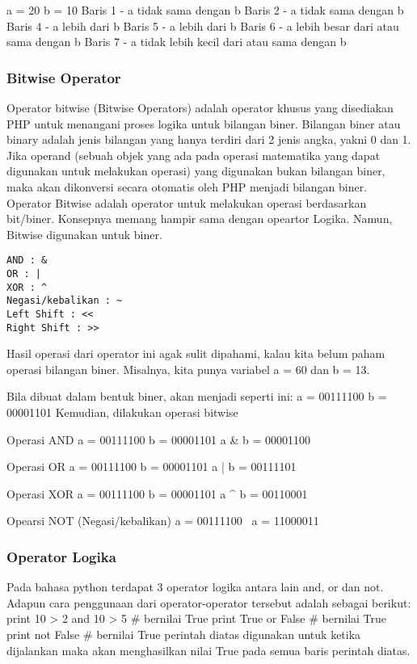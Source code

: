 \begin{eqation}
a =  20
b =  10
Baris 1 - a tidak sama dengan b
Baris 2 - a tidak sama dengan b
Baris 4 - a lebih dari b
Baris 5 - a lebih dari b
Baris 6 - a lebih besar dari atau sama dengan b
Baris 7 - a tidak lebih kecil dari atau sama dengan b

\subsubsection{Bitwise Operator}
Operator bitwise (Bitwise Operators) adalah operator khusus yang disediakan PHP untuk menangani proses logika untuk bilangan biner. Bilangan biner atau binary adalah jenis bilangan yang hanya terdiri dari 2 jenis angka, yakni 0 dan 1. Jika operand (sebuah objek yang ada pada operasi matematika yang dapat digunakan untuk melakukan operasi) yang digunakan bukan bilangan biner, maka akan dikonversi secara otomatis oleh PHP menjadi bilangan biner. Operator Bitwise adalah operator untuk melakukan operasi berdasarkan bit/biner. Konsepnya memang hampir sama dengan opeartor Logika. Namun, Bitwise digunakan untuk biner.
\begin{verbatim}
AND : &
OR : |
XOR : ^
Negasi/kebalikan : ~
Left Shift : <<
Right Shift : >>
\end{verbatim}

Hasil operasi dari operator ini agak sulit dipahami, kalau kita belum paham operasi bilangan biner.
Misalnya, kita punya variabel a = 60 dan b = 13.

Bila dibuat dalam bentuk biner, akan menjadi seperti ini:
a = 00111100
b = 00001101
Kemudian, dilakukan operasi bitwise

Operasi AND
a = 00111100
b = 00001101
a & b = 00001100

Operasi OR
a = 00111100
b = 00001101
a | b = 00111101

Operasi XOR
a = 00111100
b = 00001101
a ^ b = 00110001

Opearsi NOT (Negasi/kebalikan)
a = 00111100
~a  = 11000011


\subsubsection{Operator Logika}
Pada bahasa python terdapat 3 operator logika antara lain and, or dan not. Adapun cara penggunaan dari operator-operator tersebut adalah sebagai berikut:
print 10 > 2 and 10 > 5 # bernilai True
print True or False # bernilai True
print not False # bernilai True
perintah diatas digunakan untuk ketika dijalankan maka akan menghasilkan nilai True pada semua baris perintah diatas.


\end{eqation}
